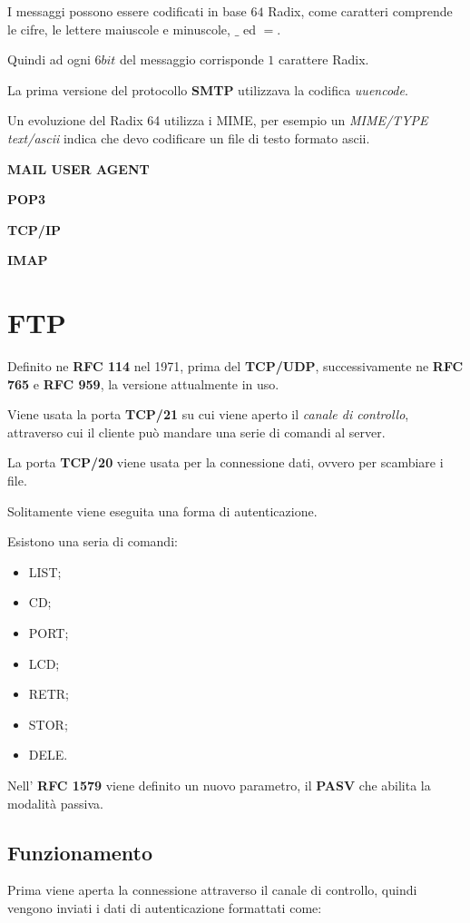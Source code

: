 I messaggi possono essere codificati in base $64$ Radix, come caratteri
comprende le cifre, le lettere maiuscole e minuscole, $\_$ ed $=$.

Quindi ad ogni $6bit$ del messaggio corrisponde $1$ carattere Radix.

La prima versione del protocollo \textbf{SMTP} utilizzava la codifica \emph{
uuencode}.


Un evoluzione del Radix 64 utilizza i MIME, per esempio un \emph{MIME/TYPE}
\emph{text/ascii} indica che devo codificare un file di testo formato ascii.

\textbf{MAIL USER AGENT}

\textbf{POP3}

\textbf{TCP/IP}

\textbf{IMAP}

\section{FTP}
Definito ne \textbf{RFC 114} nel 1971, prima del \textbf{TCP/UDP},
successivamente ne \textbf{RFC 765} e \textbf{RFC 959}, la versione
attualmente in uso.

Viene usata la porta \textbf{TCP/21} su cui viene aperto il \emph{canale di
controllo}, attraverso cui il cliente può mandare una serie di comandi al
server.

La porta \textbf{TCP/20} viene usata per la connessione dati, ovvero per
scambiare i file.

Solitamente viene eseguita una forma di autenticazione.

Esistono una seria di comandi:
\begin{itemize}
  \item LIST;
  \item CD;
  \item PORT;
  \item LCD;
  \item RETR;
  \item STOR;
  \item DELE.
\end{itemize}

Nell' \textbf{RFC 1579} viene definito un nuovo parametro, il \textbf{PASV}
che abilita la modalità passiva.

\subsection{Funzionamento}
Prima viene aperta la connessione attraverso il canale di controllo, quindi
vengono inviati i dati di autenticazione formattati come:

